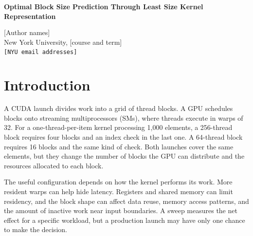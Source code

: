 \documentclass[11pt,letterpaper]{article}
\begin{document}
\begin{center}
{\Large\bfseries Optimal Block Size Prediction Through Least Size Kernel Representation\par}
\vspace{4pt}
[Author names]\\
New York University, [course and term]\\
{\small\texttt{[NYU email addresses]}}
\end{center}

\begin{abstract}
While choosing the correct CUDA block size for launching a kernel is important, the tool doing the same in runtime itself might incur significant delay. The existing methods generally reduce the kernel to a fixed size vector representation, and then find the optimal block size through a lightweight neural-network. We update this architecture by allowing the system to choose a variable size kernel representation. During training, the model learns to find the shortest kernel representation that preserves block-size prediction quality, thereby minimizing the runtime overhead of the lightweight selector. Our model learns gates over LSTM states, caches the surviving states at build time, and uses workload dimensions to score candidate sizes at runtime. On 2,785 held-out LS-CAT cases, adaptive retention pruned 16.7\% of optional gates and
achieved 5.54\% mean runtime regret at its selected epoch, compared with 5.48\% for the full-sequence model.
Across 13 live cases, toolcall achieved 1.05--1.50\ensuremath{\times} speedup over fixed 256-thread blocks
with selection time included.
\end{abstract}

\section{Introduction}

A CUDA launch divides work into a grid of thread blocks. A GPU schedules blocks onto streaming
multiprocessors (SMs), where threads execute in warps of 32. For a one-thread-per-item kernel processing
1,000 elements, a 256-thread block requires four blocks and an index check in the last one. A 64-thread
block requires 16 blocks and the same kind of check. Both launches cover the same elements, but they change
the number of blocks the GPU can distribute and the resources allocated to each block.

The useful configuration depends on how the kernel performs its work. More resident warps can help hide
latency. Registers and shared memory can limit residency, and the block shape can affect data reuse, memory
access patterns, and the amount of inactive work near input boundaries. A sweep measures the net effect for
a specific workload, but a production launch may have only one chance to make the decision.
\end{document}
